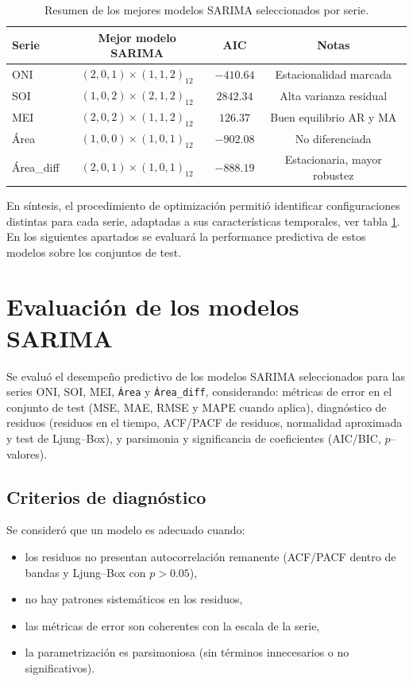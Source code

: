 \begin{table}[H]
    \centering
    \caption{Resumen de los mejores modelos SARIMA seleccionados por serie.}
    \begin{tabular}{lccc}
        \toprule
        \textbf{Serie} & \textbf{Mejor modelo SARIMA} & \textbf{AIC} & \textbf{Notas} \\
        \midrule
        ONI   & $(2,0,1)\times(1,1,2)_{12}$ & $-410.64$ & Estacionalidad marcada \\
        SOI   & $(1,0,2)\times(2,1,2)_{12}$ & $2842.34$ & Alta varianza residual \\
        MEI   & $(2,0,2)\times(1,1,2)_{12}$ & $126.37$  & Buen equilibrio AR y MA \\
        Área  & $(1,0,0)\times(1,0,1)_{12}$ & $-902.08$ & No diferenciada \\
        Área\_diff & $(2,0,1)\times(1,0,1)_{12}$ & $-888.19$ & Estacionaria, mayor robustez \\
        \bottomrule
    \end{tabular}
    \label{tab:sarima_modelos}
\end{table}

En síntesis, el procedimiento de optimización permitió identificar configuraciones distintas para cada serie, adaptadas a sus características temporales, ver tabla \ref{tab:sarima_modelos}. En los siguientes apartados se evaluará la performance predictiva de estos modelos sobre los conjuntos de test.

\section{Evaluación de los modelos SARIMA}

Se evaluó el desempeño predictivo de los modelos SARIMA seleccionados para las series
ONI, SOI, MEI, \texttt{Área} y \texttt{Área\_diff}, considerando: métricas de error en el
conjunto de test (MSE, MAE, RMSE y MAPE cuando aplica), diagnóstico de residuos
(residuos en el tiempo, ACF/PACF de residuos, normalidad aproximada y test de Ljung--Box),
y parsimonia y significancia de coeficientes (AIC/BIC, $p$--valores).

\subsection{Criterios de diagnóstico}
Se consideró que un modelo es adecuado cuando:
\begin{itemize}
    \item los residuos no presentan autocorrelación remanente (ACF/PACF dentro de bandas y Ljung--Box con $p>0.05$),
    \item no hay patrones sistemáticos en los residuos,
    \item las métricas de error son coherentes con la escala de la serie,
    \item la parametrización es parsimoniosa (sin términos innecesarios o no significativos).
\end{itemize}

